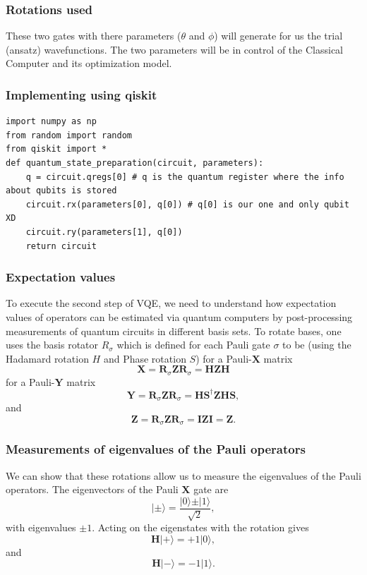 \documentclass{beamer}
\begin{document}
\begin{frame}
\frametitle{Rotations used}

These two gates with there parameters ($\theta$ and $\phi$) will generate
for us the trial (ansatz) wavefunctions. The two parameters will be in
control of the Classical Computer and its optimization model.
\end{frame}

\begin{frame}
\frametitle{Implementing using qiskit}

\begin{verbatim}
import numpy as np
from random import random
from qiskit import *
def quantum_state_preparation(circuit, parameters):
    q = circuit.qregs[0] # q is the quantum register where the info about qubits is stored
    circuit.rx(parameters[0], q[0]) # q[0] is our one and only qubit XD
    circuit.ry(parameters[1], q[0])
    return circuit

\end{verbatim}
\end{frame}

\begin{frame}
\frametitle{Expectation values}

To execute the second step of VQE, we need to understand how
expectation values of operators can be estimated via quantum computers
by post-processing measurements of quantum circuits in different
basis sets. To rotate bases, one uses the basis rotator $R_\sigma$ which is
defined for each Pauli gate $\sigma$ to be (using the Hadamard rotation $H$ and Phase rotation $S$)
for a Pauli-$\bm{X}$ matrix
\[
\bm{X}=\bm{R}_{\sigma}\bm{Z}\bm{R}_{\sigma} = \bm{HZH}
\]
for a Pauli-$\bm{Y}$ matrix
\[
\bm{Y}=\bm{R}_{\sigma}\bm{Z}\bm{R}_{\sigma}=\bm{HS}^{\dagger}\bm{ZHS},
\]
and
\[
\bm{Z}=\bm{R}_{\sigma}\bm{Z}\bm{R}_{\sigma}=\bm{I}\bm{Z}\bm{I}=\bm{Z}.
\]
\end{frame}

\begin{frame}
\frametitle{Measurements of eigenvalues of the Pauli operators}

We can show that these rotations allow us to measure the eigenvalues of the Pauli operators. The eigenvectors of the Pauli $\bm{X}$ gate are
\[
\vert\pm\rangle = \frac{\vert 0\rangle \pm \vert 1\rangle}{\sqrt{2}},
\]
with eigenvalues $\pm 1$.
Acting on the eigenstates with the rotation gives
\[
\bm{H}\vert +\rangle = +1\vert 0\rangle,
\]
and
\[
\bm{H}\vert -\rangle = -1\vert 1\rangle.
\]
\end{frame}
\end{document}
